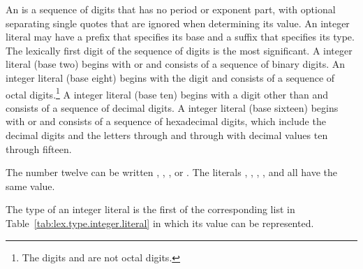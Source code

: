 \pnum
{}%
%
%
%
%
%
%
%
An  is a sequence of digits that has no period
or exponent part, with optional separating single quotes that are ignored
when determining its value. An integer literal may have a prefix that specifies
its base and a suffix that specifies its type. The lexically first digit
of the sequence of digits is the most significant.
A  integer literal (base two) begins with
 or  and consists of a sequence of binary digits.
An  integer
literal (base eight) begins with the digit  and consists of a
sequence of octal digits.\footnote{The digits  and  are not octal digits. }
A 
integer literal (base ten) begins with a digit other than  and
consists of a sequence of decimal digits.
A  integer literal (base sixteen) begins with
 or  and consists of a sequence of hexadecimal
digits, which include the decimal digits and the letters 
through  and  through  with decimal values
ten through fifteen.
\begin{example} The number twelve can be written , ,
, or . The literals ,
, , , and
 all have the same value.
\end{example}

\pnum
{}%
%
%
%
%
%
%
%
The type of an integer literal is the first of the corresponding list
in Table~\ref{tab:lex.type.integer.literal} in which its value can be
represented.

